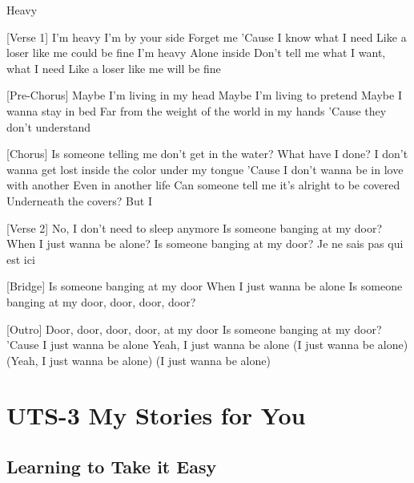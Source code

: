 \documentclass[
  letterpaper,
  DIV=11,
  numbers=noendperiod]{scrreprt}
\begin{document}
Heavy

{[}Verse 1{]} I'm heavy I'm by your side Forget me 'Cause I know what I
need Like a loser like me could be fine I'm heavy Alone inside Don't
tell me what I want, what I need Like a loser like me will be fine

{[}Pre-Chorus{]} Maybe I'm living in my head Maybe I'm living to pretend
Maybe I wanna stay in bed Far from the weight of the world in my hands
'Cause they don't understand

{[}Chorus{]} Is someone telling me don't get in the water? What have I
done? I don't wanna get lost inside the color under my tongue 'Cause I
don't wanna be in love with another Even in another life Can someone
tell me it's alright to be covered Underneath the covers? But I

{[}Verse 2{]} No, I don't need to sleep anymore Is someone banging at my
door? When I just wanna be alone? Is someone banging at my door? Je ne
sais pas qui est ici

{[}Bridge{]} Is someone banging at my door When I just wanna be alone Is
someone banging at my door, door, door, door?

{[}Outro{]} Door, door, door, door, at my door Is someone banging at my
door? 'Cause I just wanna be alone Yeah, I just wanna be alone (I just
wanna be alone) (Yeah, I just wanna be alone) (I just wanna be alone)


\chapter{UTS-3 My Stories for You}\label{uts-3-my-stories-for-you}

\section{Learning to Take it Easy}\label{learning-to-take-it-easy}
\end{document}
